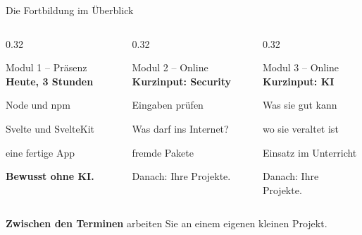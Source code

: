 \begin{frame}{Die Fortbildung im Überblick}
  \begin{columns}[onlytextwidth,t]
    \begin{column}{0.32\textwidth}
      \begin{block}{Modul 1 -- Präsenz}
        \footnotesize\textbf{Heute, 3 Stunden}
        \begin{tugitemize}
          \item Node und npm
          \item Svelte und SvelteKit
          \item eine fertige App
        \end{tugitemize}
        \textbf{Bewusst ohne KI.}
      \end{block}
    \end{column}
    \begin{column}{0.32\textwidth}
      \begin{block}{Modul 2 -- Online}
        \footnotesize\textbf{Kurzinput: Security}
        \begin{tugitemize}
          \item Eingaben prüfen
          \item Was darf ins Internet?
          \item fremde Pakete
        \end{tugitemize}
        Danach: Ihre Projekte.
      \end{block}
    \end{column}
    \begin{column}{0.32\textwidth}
      \begin{block}{Modul 3 -- Online}
        \footnotesize\textbf{Kurzinput: KI}
        \begin{tugitemize}
          \item Was sie gut kann
          \item wo sie veraltet ist
          \item Einsatz im Unterricht
        \end{tugitemize}
        Danach: Ihre Projekte.
      \end{block}
    \end{column}
  \end{columns}
  \vspace{0.4em}
  \footnotesize\centering
  \itemArrowLine \textbf{Zwischen den Terminen} arbeiten Sie an einem eigenen kleinen Projekt.
\end{frame}

